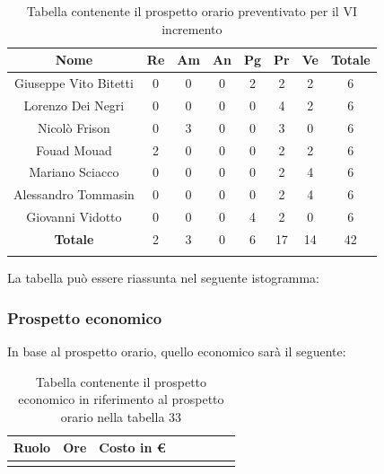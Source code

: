 			\begin{longtable}{|c|c|c|c|c|c|c|c}
				\hline
				\rowcolor{lighter-grayer}
				\textbf{Nome} & \textbf{Re} & \textbf{Am} & \textbf{An} & \textbf{Pg}  & \textbf{Pr}   & \textbf{Ve} & \textbf{Totale} \\
				\hline
				\endfirsthead
				\hline
				Giuseppe Vito Bitetti & 0 & 0 & 0 & 2 & 2 & 2 & 6\\
				\hline
				\hline
				Lorenzo Dei Negri & 0 & 0 & 0 & 0 & 4 & 2 & 6\\
				\hline
				\hline
				Nicolò Frison & 0 & 3 & 0 & 0 & 3 & 0 & 6\\
				\hline
				\hline
				Fouad Mouad & 2 & 0 & 0 & 0 & 2 & 2 & 6 \\
				\hline
				\hline
				Mariano Sciacco & 0 & 0 & 0 & 0 & 2 & 4 & 6\\
				\hline
				\hline
				Alessandro Tommasin & 0 & 0 & 0 & 0 & 2 & 4 & 6\\
				\hline
				\hline
				Giovanni Vidotto & 0 & 0 & 0 & 4 & 2 & 0 & 6\\
				\hline 
				\textbf{Totale} & 2 &  3 & 0 & 6 & 17 & 14 & 42 \\
				\hline  
				
				\caption{Tabella contenente il prospetto orario preventivato per il VI incremento}
			\end{longtable}
			\pagebreak	
			
			La tabella può essere riassunta nel seguente istogramma:
			
			
		\subsubsection{Prospetto economico}
			In base al prospetto orario, quello economico sarà il seguente: 
			
			\begin{longtable}{|c|c|c|c|c|c|c|c}
				\hline
				\rowcolor{lighter-grayer}
				\textbf{Ruolo} & \textbf{Ore} & \textbf{Costo in €} \\
				\hline
				\endfirsthead
				
				\caption{Tabella contenente il prospetto economico in riferimento al prospetto orario nella tabella 33}
			\end{longtable}
			\pagebreak
			
